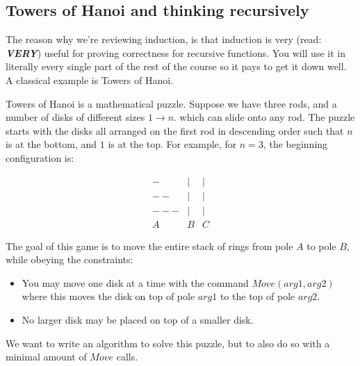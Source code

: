 \subsection{Towers of Hanoi and thinking recursively}

The reason why we're reviewing induction, is that induction is very (read:
\textit{\textbf{VERY}}) useful for proving correctness for recursive functions.
You will use it in literally every single part of the rest of the course so it
pays to get it down well. A classical example is Towers of Hanoi.

\begin{definition*}

Towers of Hanoi is a mathematical puzzle. Suppose we have three rods, and a
number of disks of different sizes $1 \to n$. which can slide onto any rod. The
puzzle starts with the disks all arranged on the first rod in descending
order such that $n$ is at the bottom, and $1$ is at the top. For example, for $n
= 3$, the beginning configuration is:

$$
\begin{matrix}
-   & | & | \\
--  & | & | \\ 
--- & | & | \\ 
A & B & C 
\end{matrix}
$$

The goal of this game is to move the entire stack of rings from pole $A$ to pole
$B$, while obeying the constraints:

\begin{itemize}

\item You may move one disk at a time with the command $Move(arg1, arg2)$ where
this moves the disk on top of pole $arg1$ to the top of pole $arg2$.

\item No larger disk may be placed on top of a smaller disk.

\end{itemize}

\end{definition*}

We want to write an algorithm to solve this puzzle, but to also do so with a
minimal amount of $Move$ calls.


